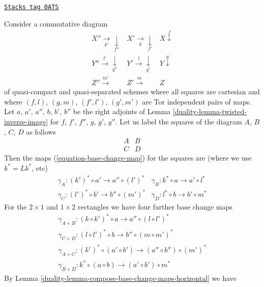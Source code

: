 \begin{remark}
\label{duality-remark-going-around}
\href{https://stacks.math.columbia.edu/tag/0ATS}{\texttt{Stacks tag 0ATS}}

Consider a commutative diagram
$$
\begin{array}{ccc}X'' \underset{k'}{\longrightarrow}\underset{f''}{\downarrow} & X' \underset{k}{\longrightarrow}\underset{f'}{\downarrow} & X \overset{f}{\downarrow} \\ Y'' \overset{l'}{\longrightarrow}\underset{g''}{\downarrow} & Y' \overset{l}{\longrightarrow}\underset{g'}{\downarrow} & Y \overset{g}{\downarrow} \\ Z'' \overset{m'}{\longrightarrow} & Z' \overset{m}{\longrightarrow} & Z\end{array}
$$
of quasi-compact and quasi-separated schemes where
all squares are cartesian and where
$(f, l)$, $(g, m)$, $(f', l')$, $(g', m')$ are
Tor independent pairs of maps.
Let $a$, $a'$, $a''$, $b$, $b'$, $b''$ be the
right adjoints of Lemma \ref{duality-lemma-twisted-inverse-image}
for $f$, $f'$, $f''$, $g$, $g'$, $g''$.
Let us label the squares of the diagram $A$, $B$, $C$, $D$
as follows
$$
\begin{matrix}
A & B \\
C & D
\end{matrix}
$$
Then the maps (\ref{equation-base-change-map})
for the squares are (where we use $k^* = Lk^*$, etc)
$$
\begin{matrix}
\gamma_A : (k')^* \circ a' \to a'' \circ (l')^* &
\gamma_B : k^* \circ a \to a' \circ l^* \\
\gamma_C : (l')^* \circ b' \to b'' \circ (m')^* &
\gamma_D : l^* \circ b \to b' \circ m^*
\end{matrix}
$$
For the $2 \times 1$ and $1 \times 2$ rectangles we have four further
base change maps
$$
\begin{matrix}
\gamma_{A + B} : (k \circ k')^* \circ a \to a'' \circ (l \circ l')^* \\
\gamma_{C + D} : (l \circ l')^* \circ b \to b'' \circ (m \circ m')^* \\
\gamma_{A + C} : (k')^* \circ (a' \circ b') \to (a'' \circ b'') \circ (m')^* \\
\gamma_{B + D} : k^* \circ (a \circ b) \to (a' \circ b') \circ m^*
\end{matrix}
$$
By Lemma \ref{duality-lemma-compose-base-change-maps-horizontal} we have

\end{remark}
